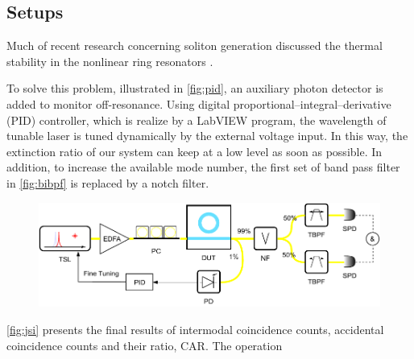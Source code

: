 \subsection{Setups}

Much of recent research concerning soliton generation discussed the thermal stability in the nonlinear ring resonators \cites{Guo2017a,Herr2012}. 

To solve this problem, illustrated in \autoref{fig:pid}, an auxiliary photon detector is added to monitor off-resonance. Using digital proportional–integral–derivative (PID) controller, which is realize by a LabVIEW program, the wavelength of tunable laser is tuned dynamically by the external voltage input. In this way, the extinction ratio of our system can keep at a low level as soon as possible. In addition, to increase the available mode number, the first set of band pass filter in \autoref{fig:bibpf} is replaced by a notch filter. 

\begin{figure}
	\centering
	\includegraphics[width=1\linewidth]{imgs/pid.pdf}
	\caption{}
	\label{fig:pid}
\end{figure}

\autoref{fig:jsi} presents the final results of intermodal coincidence counts, accidental coincidence counts and their ratio, CAR. The operation 

\begin{figure}
	\centering
	
	\label{fig:flux2}
\end{figure}

\begin{figure}
	\centering
	
	\mycaption{}{}
	\label{fig:jsi}
\end{figure}



